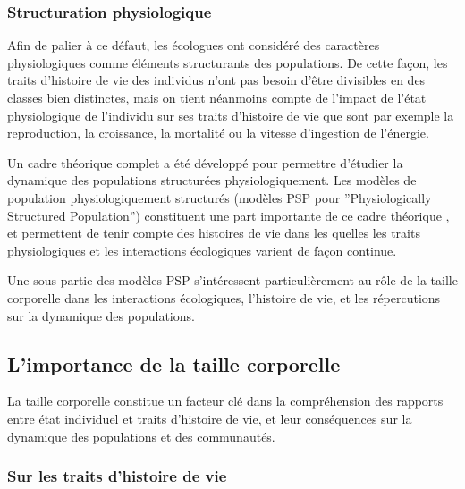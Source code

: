 \subsubsection{Structuration physiologique}

Afin de palier à ce défaut, les écologues ont considéré des caractères
physiologiques comme éléments structurants des populations. De cette façon, les
traits d'histoire de vie des individus n'ont pas besoin d'être divisibles en des
classes bien distinctes, mais on tient néanmoins compte de l'impact de l'état
physiologique de l'individu sur ses traits d'histoire de vie que sont par
exemple la reproduction, la croissance, la mortalité ou la vitesse d'ingestion
de l'énergie. 

Un cadre théorique complet a été développé pour permettre d'étudier la dynamique
des populations structurées physiologiquement. Les modèles de
population physiologiquement structurés (modèles PSP pour ''Physiologically
Structured Population'') constituent une part importante de ce cadre théorique
\autocite{metz1986a,de-roos1992a,de-roos1997a}, et permettent de tenir compte
des histoires de vie dans les quelles les traits physiologiques et les
interactions écologiques varient de façon continue. 

Une sous partie des modèles PSP s'intéressent particulièrement au rôle de la
taille corporelle dans les interactions écologiques, l'histoire de vie, et les
répercutions sur la dynamique des populations. 

\subsection{L'importance de la taille corporelle}

La taille corporelle constitue un facteur clé dans la compréhension des rapports
entre état individuel et traits d'histoire de vie, et leur conséquences sur la
dynamique des populations et des communautés. 

\subsubsection{Sur les traits d'histoire de vie}

